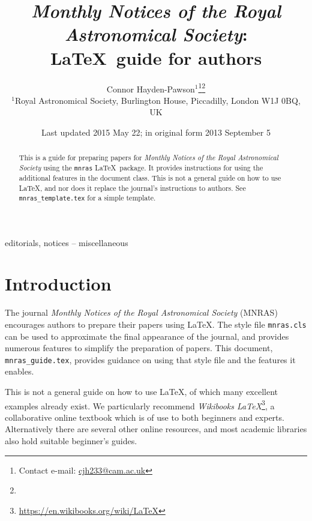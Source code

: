 \documentclass[fleqn,usenatbib,useAMS]{mnras}
\title[MNRAS \LaTeX\ guide for authors]{\textit{Monthly Notices of the Royal Astronomical
  Society}: \\ \LaTeX\ guide for authors}
\author[Connor Hayden-Pawson]{Connor Hayden-Pawson$^{1}$\thanks{Contact e-mail: \href{mailto:cjh233@cam.ac.uk}{cjh233@cam.ac.uk}}\thanks{}
\\
$^{1}$Royal Astronomical Society, Burlington House, Piccadilly, London W1J 0BQ, UK}
\date{Last updated 2015 May 22; in original form 2013 September 5}
\begin{document}
\label{firstpage}
\pagerange{\pageref{firstpage}--\pageref{lastpage}}
\maketitle

\begin{abstract}
This is a guide for preparing papers for \textit{Monthly Notices of the Royal Astronomical Society} using the \verb'mnras' \LaTeX\ package.
It provides instructions for using the additional features in the document class.
This is not a general guide on how to use \LaTeX, and nor does it replace the journal's instructions to authors.
See \texttt{mnras\_template.tex} for a simple template.
\end{abstract}

\begin{keywords}
editorials, notices -- miscellaneous
\end{keywords}



\begingroup
\let\clearpage\relax
\tableofcontents
\endgroup
\newpage

\section{Introduction}

The journal \textit{Monthly Notices of the Royal Astronomical Society} (MNRAS) encourages authors to prepare their papers using \LaTeX.
The style file \verb'mnras.cls' can be used to approximate the final appearance of the journal, and provides numerous features to simplify the preparation of papers.
This document, \verb'mnras_guide.tex', provides guidance on using that style file and the features it enables.

This is not a general guide on how to use \LaTeX, of which many excellent examples already exist.
We particularly recommend \textit{Wikibooks \LaTeX}\footnote{\url{https://en.wikibooks.org/wiki/LaTeX}}, a collaborative online textbook which is of use to both beginners and experts.
Alternatively there are several other online resources, and most academic libraries also hold suitable beginner's guides.
\end{document}
